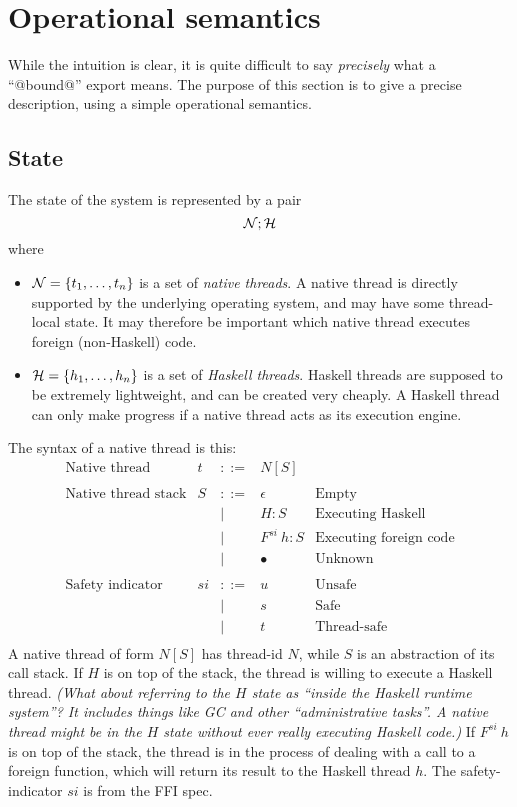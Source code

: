\documentclass{article}
\newcommand{\NS}{{\cal N}}
\newcommand{\HS}{{\cal H}}
\newcommand{\hcall}{H}
\newcommand{\fcall}[2]{F^{#1}~#2}
\begin{document}
\section{Operational semantics}

While the intuition is clear, it is quite difficult to say \emph{precisely} what a ``@bound@'' export means.
The purpose of this section is to give a precise description, using a simple operational semantics.


\subsection{State}

The state of the system is represented by a pair
$$\NS ; \HS$$
where 
\begin{itemize}
\item $\NS = \{t_1, \ldots ,t_n\}$ is a set of \emph{native threads}.
A native thread is directly supported by the underlying operating
system, and may have some thread-local state. It may therefore
be important which native thread executes foreign
(non-Haskell) code.

\item $\HS = \{h_1, \ldots ,h_n\}$ is a set of \emph{Haskell threads}.
Haskell threads are supposed to be extremely lightweight, and
can be created very cheaply. A Haskell thread can only make progress
if a native thread acts as its execution engine.
\end{itemize}

The syntax of a native thread is this:
$$
\begin{array}{lrcll}
\mbox{Native thread} &  t & ::= & N[S] \\
\\
\mbox{Native thread stack} &  S & ::= & \epsilon & \mbox{Empty}\\
        & & | & \hcall : S  & \mbox{Executing Haskell} \\
        & & | & \fcall{si}{h} : S & \mbox{Executing foreign code}\\
        & & | & \bullet & \mbox{Unknown}\\
\\
\mbox{Safety indicator} &  si & ::= & u & \mbox{Unsafe} \\
        & & | & s & \mbox{Safe} \\
        & & | & t & \mbox{Thread-safe} \\
\end{array}
$$
A native thread of form $N[S]$ has thread-id $N$, while $S$ is
an abstraction of its call stack.  If $\hcall$ is on top of the stack,
the thread is willing to execute a Haskell thread.
\emph{(What about referring to the $\hcall$ state as
``inside the Haskell runtime system''? It includes things like GC and other
``administrative tasks''. A native thread might be in the $\hcall$ state 
without ever really executing Haskell code.)}
If $\fcall{si}{h}$ is
on top of the stack, the thread is in the process of dealing with a call
to a foreign function, which will return its result to the Haskell thread
$h$.  The safety-indicator $si$ is from the FFI spec.
\end{document}
